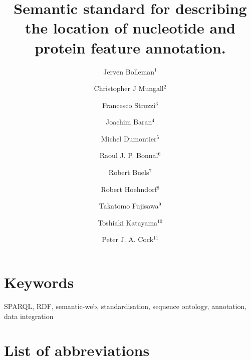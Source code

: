 \documentclass[10pt]{bmc_article}
\newenvironment{bmcformat}{\begin{raggedright}\baselineskip20pt\sloppy\setboolean{publ}{false}}{\end{raggedright}\baselineskip20pt\sloppy}
\begin{document}
\begin{bmcformat}
\title{Semantic standard for describing the location of nucleotide and protein feature annotation.}
\author{Jerven Bolleman\correspondingauthor$^{1}$%
    \and Christopher J Mungall$^{2}$%
    \and Francesco Strozzi$^{3}$%
    \and Joachim Baran$^{4}$%
    \and Michel Dumontier$^{5}$%
    \and Raoul J. P. Bonnal$^{6}$%
    \and Robert Buels$^{7}$%
    \and Robert Hoehndorf$^{8}$%
    \and Takatomo Fujisawa$^{9}$%
    \and Toshiaki Katayama$^{10}$%
    \and Peter J. A. Cock$^{11}$%
%
}
\address{
 \iid(1) SIB Swiss Institute of Bioinformatics, Centre Medical Universitaire, 1 rue Michel
Servet, 1211 Geneva 4, Switzerland,
 \iid(2) Genomics Division, Lawrence Berkeley National Laboratory, Berkeley, CA, 94720, US,
 \iid(3) CeRSA, Parco Tecnologico Padano, Lodi 26900, Italy,
 \iid(4) Ontario Institute for Cancer Research, 101 College Street, Suite 800, Toronto, Ontario, M5G 0A3, Canada,
 \iid(5) Stanford Center for Biomedical Informatics Research, 1265 Welch Road, Room X223, Stanford, CA, 94305-5479, US,
 \iid(6) Integrative Biology Program, Istituto Nazionale Genetica Molecolare, Milan, Italy,
 \iid(7) University of California, Berkeley, Berkeley, CA, USA,
 \iid(8) Department of Computer Science, Aberystwyth, SY23 3DB, UK,
 \iid(9) Center for Information Biology, National Institute of Genetics, Research Organization of Information and Systems, 1111 Yata, Mishima, Shizuoka 411-08540, Japan,
 \iid(10) Database Center for Life Science, Research Organization of Information and Systems, 2-11-16, Yayoi, Bunkyo-ku, Tokyo, 113-0032, Japan, and
 \iid(11) The James Hutton Institute, Dundee, DD2 5DA, UK.
}
\maketitle


\section*{Keywords}
SPARQL, RDF, semantic-web, standardisation, sequence ontology, annotation, data integration









\section*{List of abbreviations}


\end{bmcformat}
\end{document}
